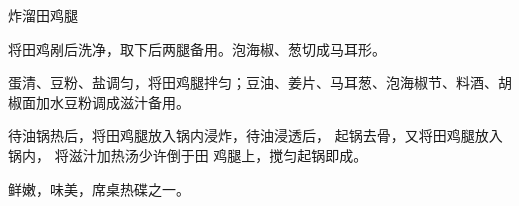 \begin{recipe}{炸溜田鸡腿}

\ingredients


\preparation

\step 将田鸡剐后洗净，取下后两腿备用。泡海椒、葱切成马耳形。

\step 蛋清、豆粉、盐调匀，将田鸡腿拌匀；豆油、姜片、马耳葱、泡海椒节、料酒、胡
椒面加水豆粉调成滋汁备用。

待油锅热后，将田鸡腿放入锅内浸炸，待油浸透后， 起锅去骨，又将田鸡腿放入锅内，
将滋汁加热汤少许倒于田 鸡腿上，搅匀起锅即成。

\features

鲜嫩，味美，席桌热碟之一。

\end{recipe}

